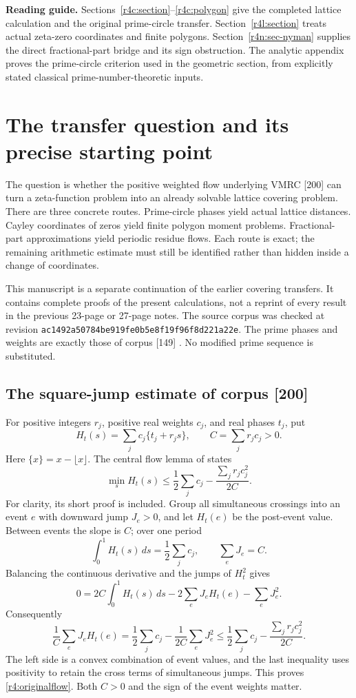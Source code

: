 \documentclass[11pt,a4paper]{article}
\theoremstyle{definition}\newtheorem{definition}[theorem]{Definition}
\theoremstyle{remark}\newtheorem{remark}[theorem]{Remark}
\numberwithin{equation}{section}
\begin{document}
\tableofcontents
\medskip
\noindent\textbf{Reading guide.}
Sections~\ref{r4c:section}--\ref{r4c:polygon} give the completed lattice
calculation and the original prime-circle transfer.
Section~\ref{r4l:section} treats actual zeta-zero coordinates and finite
polygons. Section~\ref{r4n:sec-nyman} supplies the direct fractional-part
bridge and its sign obstruction. The analytic appendix proves the
prime-circle criterion used in the geometric section, from explicitly
stated classical prime-number-theoretic inputs.
\clearpage

\section{The transfer question and its precise starting point}
\label{r4:intro}

The question is whether the positive weighted flow underlying VMRC
[200] can turn a zeta-function problem into an already solvable lattice
covering problem. There are three concrete routes. Prime-circle
phases yield actual lattice distances. Cayley coordinates of zeros
yield finite polygon moment problems. Fractional-part approximations
yield periodic residue flows. Each route is exact; the remaining
arithmetic estimate must still be identified rather than hidden inside
a change of coordinates.

This manuscript is a separate continuation of the earlier covering
transfers. It contains complete proofs of the present calculations,
not a reprint of every result in the previous 23-page or 27-page notes.
The source corpus was checked at revision
\texttt{ac1492a50784be919fe0b5e8f19f96f8d221a22e}.
The prime phases and weights are exactly those of corpus [149]
\cite{PrimeCircles}. No modified prime sequence is substituted.

\subsection{The square-jump estimate of corpus [200]}

For positive integers $r_j$, positive real weights $c_j$, and real
phases $t_j$, put
\[
 H_t(s)=\sum_jc_j\{t_j+r_js\},\qquad C=\sum_jr_jc_j>0.
\]
Here $\{x\}=x-\lfloor x\rfloor$. The central flow lemma of
\cite{VMRC200} states
\begin{equation}\label{r4:originalflow}
 \min_sH_t(s)\le
 \frac12\sum_jc_j-\frac{\sum_jr_jc_j^2}{2C}.
\end{equation}
For clarity, its short proof is included. Group all simultaneous
crossings into an event $e$ with downward jump $J_e>0$, and let
$H_t(e)$ be the post-event value. Between events the slope is $C$;
over one period
\[
 \int_0^1H_t(s)\,ds=\frac12\sum_jc_j,
 \qquad \sum_eJ_e=C.
\]
Balancing the continuous derivative and the jumps of $H_t^2$ gives
\[
 0=2C\int_0^1H_t(s)\,ds
       -2\sum_eJ_eH_t(e)-\sum_eJ_e^2.
\]
Consequently
\[
 \frac1C\sum_eJ_eH_t(e)
 =\frac12\sum_jc_j-\frac1{2C}\sum_eJ_e^2
 \le\frac12\sum_jc_j-\frac{\sum_jr_jc_j^2}{2C}.
\]
The left side is a convex combination of event values, and the last
inequality uses positivity to retain the cross terms of simultaneous
jumps. This proves \eqref{r4:originalflow}. Both $C>0$ and the sign
of the event weights matter.
\end{document}
